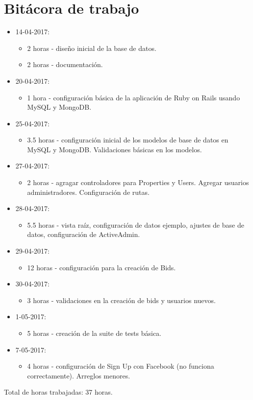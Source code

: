 \documentclass{article}
\begin{document}
\section{Bit\'acora de trabajo}
\begin{itemize}
  \item 14-04-2017:
  \begin{itemize}
    \item 2 horas - dise\~no inicial de la base de datos.
    \item 2 horas - documentaci\'on.
  \end{itemize}
  \item 20-04-2017:
  \begin{itemize}
    \item 1 hora - configuraci\'on b\'asica de la aplicaci\'on de Ruby on Rails usando MySQL y MongoDB.
  \end{itemize}
  \item 25-04-2017:
  \begin{itemize}
    \item 3.5 horas - configuraci\'on inicial de los modelos de base de datos en MySQL y MongoDB. Validaciones b\'asicas en los modelos.
  \end{itemize}
  \item 27-04-2017:
  \begin{itemize}
    \item 2 horas - agragar controladores para Properties y Users. Agregar usuarios administradores. Configuraci\'on de rutas.
  \end{itemize}
  \item 28-04-2017:
  \begin{itemize}
    \item 5.5 horas - vista ra\'iz, configuraci\'on de datos ejemplo, ajustes de base de datos, configuraci\'on de ActiveAdmin.
  \end{itemize}
  \item 29-04-2017:
  \begin{itemize}
    \item 12 horas - configuraci\'on para la creaci\'on de Bids.
  \end{itemize}
  \item 30-04-2017:
  \begin{itemize}
    \item 3 horas - validaciones en la creaci\'on de bids y usuarios nuevos.
  \end{itemize}
  \item 1-05-2017:
  \begin{itemize}
    \item 5 horas - creaci\'on de la suite de tests b\'asica.
  \end{itemize}
  \item 7-05-2017:
  \begin{itemize}
    \item 4 horas - configuraci\'on de Sign Up con Facebook (no funciona correctamente). Arreglos menores.
  \end{itemize}
\end{itemize}
Total de horas trabajadas: 37 horas.
\end{document}
